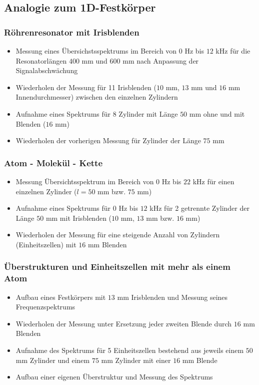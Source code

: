 \documentclass[german,  %
parskip=full,  %
]{scrartcl}
\begin{document}
\subsection{Analogie zum 1D-Festkörper}
\subsubsection{Röhrenresonator mit Irisblenden}
\begin{itemize}
\item Messung eines Übersichstsspektrums im Bereich von $0$ Hz bis $12$ kHz für die Resonatorlängen $400$ mm und $600$ mm nach Anpassung der Signalabschwächung
\item Wiederholen der Messung für 11 Irisblenden ($10$ mm, $13$ mm und $16$ mm Innendurchmesser) zwischen den einzelnen Zylindern
\item Aufnahme eines Spektrums für 8 Zylinder mit Länge $50$ mm ohne und mit Blenden ($16$ mm)
\item Wiederholen der vorherigen Messung für Zylinder der Länge $75$ mm
\end{itemize}
\subsubsection{Atom - Molekül - Kette}
\begin{itemize}
\item Messung Übersichtsspektrum im Bereich von $0$ Hz bis $22$ kHz für einen einzelnen Zylinder ($l=50$ mm bzw. $75$ mm)
\item Aufnahme eines Spektrums für $0$ Hz bis $12$ kHz für 2 getrennte Zylinder der Länge $50$ mm mit Irisblenden ($10$ mm, $13$ mm bzw. $16$ mm)
\item Wiederholen der Messung für eine steigende Anzahl von Zylindern (Einheitszellen) mit $16$ mm Blenden
\end{itemize}
\subsubsection{Überstrukturen und Einheitszellen mit mehr als einem Atom}
\begin{itemize}
\item Aufbau eines Festkörpers mit $13$ mm Irisblenden und Messung seines Frequenzspektrums
\item Wiederholen der Messung unter Ersetzung jeder zweiten Blende durch $16$ mm Blenden
\item Aufnahme des Spektrums für 5 Einheitszellen bestehend aus jeweils einem $50$ mm Zylinder und einem $75$ mm Zylinder mit einer $16$ mm Blende
\item Aufbau einer eigenen Überstruktur und Messung des Spektrums 
\end{itemize}
\end{document}
